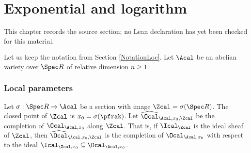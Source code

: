 \chapter{Exponential and logarithm}
\label{chabauty-coleman-bound-surfaces-chapter-07}

\begin{remark}
\label{chabauty-coleman-bound-surfaces-chapter-07-source}
This chapter records the source section; no Lean declaration has yet been checked for this material.
\notready
\end{remark}

\label{SecLogExp}

Let us keep the notation from Section \ref{NotationLoc}. Let $\Acal$ be an abelian variety over $\Spec R$ of relative dimension $n\ge 1$.
\subsection{Local parameters} \label{SecLogExp1}


Let $\sigma:\Spec R\to \Acal$ be a section with image $\Zcal=\sigma(\Spec R)$. The closed point of $\Zcal$ is $x_0=\sigma(\pfrak)$. Let $\widehat{\Ocal}_{\Acal ,x_0,\Zcal}$ be the completion of $\Ocal_{\Acal,x_0}$ along $\Zcal$.  That is, if $\Ical_\Zcal$ is the ideal sheaf of $\Zcal$, then $\widehat{\Ocal}_{\Acal ,x_0,\Zcal}$ is the completion of $\Ocal_{\Acal,x_0}$ with respect to the ideal $\Ical_{\Zcal,x_0}\subseteq\Ocal_{\Acal,x_0}$.

